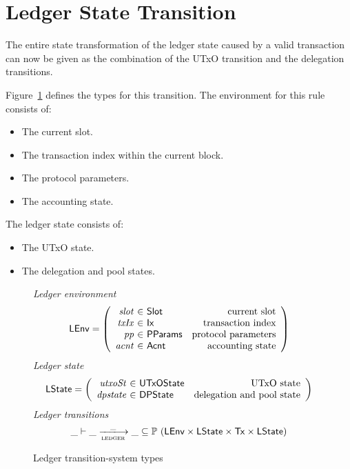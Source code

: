 \section{Ledger State Transition}
\label{sec:ledger-trans}

The entire state transformation of the ledger state caused by a valid transaction
can now be given as the combination of the UTxO transition and the delegation transitions.

Figure~\ref{fig:ts-types:ledger} defines the types for this transition.
The environment for this rule consists of:
\begin{itemize}
  \item The current slot.
  \item The transaction index within the current block.
  \item The protocol parameters.
  \item The accounting state.
\end{itemize}
The ledger state consists of:
\begin{itemize}
  \item The UTxO state.
  \item The delegation and pool states.
\end{itemize}

\begin{figure}[htb]
  \emph{Ledger environment}
  \begin{equation*}
    \LEnv =
    \left(
      \begin{array}{r@{~\in~}lr}
        \var{slot} & \Slot & \text{current slot}\\
        \var{txIx} & \Ix & \text{transaction index}\\
        \var{pp} & \PParams & \text{protocol parameters}\\
        \var{acnt} & \Acnt & \text{accounting state}
      \end{array}
    \right)
  \end{equation*}
  \emph{Ledger state}
  \begin{equation*}
    \LState =
    \left(
      \begin{array}{r@{~\in~}lr}
        \var{utxoSt} & \UTxOState & \text{UTxO state}\\
        \var{dpstate} & \DPState & \text{delegation and pool state}\\
      \end{array}
    \right)
  \end{equation*}
  \emph{Ledger transitions}
  \begin{equation*}
    \_ \vdash
    \var{\_} \trans{ledger}{\_} \var{\_}
    \subseteq \powerset (\LEnv \times \LState \times \Tx \times \LState)
  \end{equation*}
  \caption{Ledger transition-system types}
  \label{fig:ts-types:ledger}
\end{figure}

